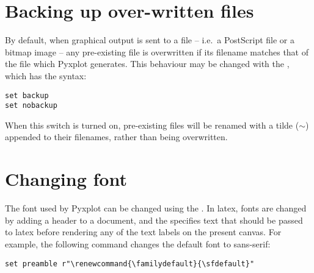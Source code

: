 \section{Backing up over-written files}
\label{sec:file_backup}

By default, when graphical output is sent to a file -- i.e.\ a PostScript file
or a bitmap image -- any pre-existing file is overwritten if its filename
matches that of the file which Pyxplot generates. This behaviour may be changed
with the , which has the syntax:

\begin{verbatim}
set backup
set nobackup
\end{verbatim}

When this switch is turned on, pre-existing files will be renamed with a tilde
($\sim$) appended to their filenames, rather than being overwritten.

\section{Changing font}

The font used by Pyxplot can be changed using the .  In
latex, fonts are changed by adding a header to a document, and the  specifies text that should be passed to latex before rendering any of
the text labels on the present canvas.  For example, the following command
changes the default font to sans-serif:

\begin{verbatim}
set preamble r"\renewcommand{\familydefault}{\sfdefault}"
\end{verbatim}

